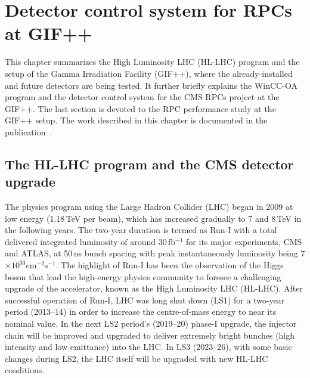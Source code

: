 \graphicspath{{chapt_dutch/}{intro/}{chapt2/}{chapt3/}{chapt4/}{chapt5/}{chapt6/}{chapt7/}{chapt8/}}

\renewcommand\evenpagerightmark{{\scshape\small Chapter 4}}
\renewcommand\oddpageleftmark{{\scshape\small Detector Control System for RPCs at GIF++}}

\renewcommand{\bibname}{References}

\hyphenation{}

\chapter[Detector control system for RPCs at GIF++]%
{Detector control system for RPCs at GIF++}\label{chapt:4}
This chapter summarizes the High Luminosity LHC (HL-LHC) program and the setup of the Gamma Irradiation Facility (GIF++), where the already-installed and future detectors are being tested. It further briefly explains the WinCC-OA program and the detector control system for the CMS RPCs project at the GIF++. The last section is devoted to the RPC performance study at the GIF++ setup. The work described in this chapter is documented in the publication~\cite{1748-0221-11-10-C10013}.  
\section{The HL-LHC program and the CMS detector upgrade}
The physics program using the Large Hadron Collider (LHC) began in 2009 at low energy (1.18\,TeV per beam), which has increased gradually to 7 and 8\,TeV in the following years. The two-year duration is termed as Run-I with a total delivered integrated luminosity of around 30\,fb$^{-1}$ for its major experiments, CMS and ATLAS, at 50\,ns bunch spacing with peak instantaneously luminosity being 7$\times 10^{33}\text{cm}^{-2}\text{s}^{-1}$. The highlight of  Run-I has been the observation of the Higgs boson that lead the high-energy physics community to foresee a challenging upgrade of the accelerator, known as the High Luminosity LHC (HL-LHC). After successful operation of Run-I, LHC was long shut down (LS1) for a two-year period (2013–14) in order to increase the centre-of-mass energy to near its nominal value. In the next LS2 period’s (2019–20) phase-I upgrade, the injector chain will be improved and upgraded to deliver extremely bright bunches (high intensity and low emittance) into the LHC. In LS3 (2023–26), with some basic changes during LS2, the LHC itself will be upgraded with new HL-LHC conditions. 


